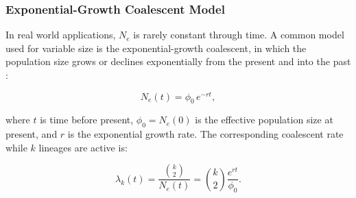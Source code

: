 \documentclass[11pt, a4paper]{article}
\begin{document}

\subsubsection{Exponential-Growth Coalescent Model}

In real world applications, $N_e$ is rarely constant through time. A common model used for variable size is the exponential-growth coalescent, in which the population size grows or declines exponentially from the present and into the past \cite{drummond2002}: 

\begin{equation}
N_e(t) = \phi_0\,e^{-rt},
\label{eq:exp_ne}
\end{equation}

where $t$ is time before present, $\phi_0=N_e(0)$ is the effective population size at present, and $r$ is the exponential growth rate. The corresponding coalescent rate while $k$ lineages are active is:

\begin{equation}
\lambda_k(t) = \frac{\binom{k}{2}}{N_e(t)}
             = \binom{k}{2}\frac{e^{rt}}{\phi_0}.
\label{eq:exp_rate}
\end{equation}
\end{document}

